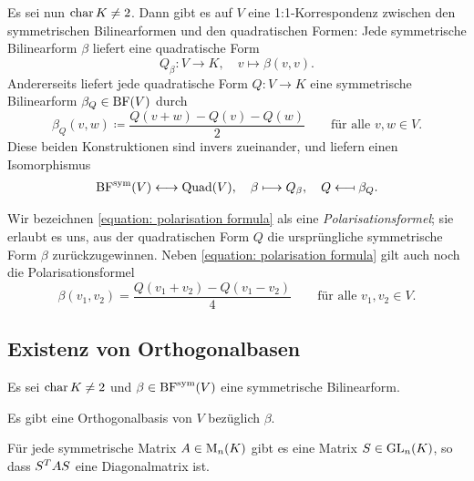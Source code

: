 Es sei nun $\operatorname{char} K \neq 2$.
Dann gibt es auf $V$ eine 1:1-Korrespondenz zwischen den symmetrischen Bilinearformen und den quadratischen Formen:
Jede symmetrische Bilinearform $\beta$ liefert eine quadratische Form
\[
          Q_\beta
  \colon  V
  \to     K,
  \quad   v
  \mapsto \beta(v,v).
\]
Andererseits liefert jede quadratische Form $Q \colon V \to K$ eine symmetrische Bilinearform $\beta_Q \in \operatorname{BF}(V)$ durch
\begin{equation}
  \label{equation: polarisation formula}
            \beta_Q(v,w)
  \coloneqq \frac{Q(v+w) - Q(v) - Q(w)}{2}
  \qquad
  \text{für alle $v, w \in V$}.
\end{equation}
Diese beiden Konstruktionen sind invers zueinander, und liefern einen Isomorphismus
\begin{align*}
                      \operatorname{BF}^{\operatorname{sym}}(V)
  \longleftrightarrow \operatorname{Quad}(V),
  \quad
                      \beta
  \longmapsto         Q_\beta,
  \quad
                      Q
  \longmapsfrom       \beta_Q.
\end{align*}

Wir bezeichnen \eqref{equation: polarisation formula} als eine \emph{Polarisationsformel};
sie erlaubt es uns, aus der quadratischen Form $Q$ die ursprüngliche symmetrische Form $\beta$ zurückzugewinnen.
Neben \eqref{equation: polarisation formula} gilt auch noch die Polarisationsformel
\[
    \beta(v_1, v_2)
  = \frac{Q(v_1 + v _2) - Q(v_1 - v_2)}{4}
  \qquad
  \text{für alle $v_1, v_2 \in V$}.
\]





\subsection{Existenz von Orthogonalbasen}

Es sei $\operatorname{char} K \neq 2$ und $\beta \in \operatorname{BF}^{\operatorname{sym}}(V)$ eine symmetrische Bilinearform.

\begin{theorem}
  \label{theorem: exstience of an orthogonal basis}
  Es gibt eine Orthogonalbasis von $V$ bezüglich $\beta$.
\end{theorem}

\begin{corollary}
  \label{corollary: every symmetric matrix is congruent to a diagonal matrix}
  Für jede symmetrische Matrix $A \in \operatorname{M}_{n}(K)$ gibt es eine Matrix $S \in \operatorname{GL}_{n}(K)$, so dass $S^T A S$ eine Diagonalmatrix ist.
\end{corollary}

